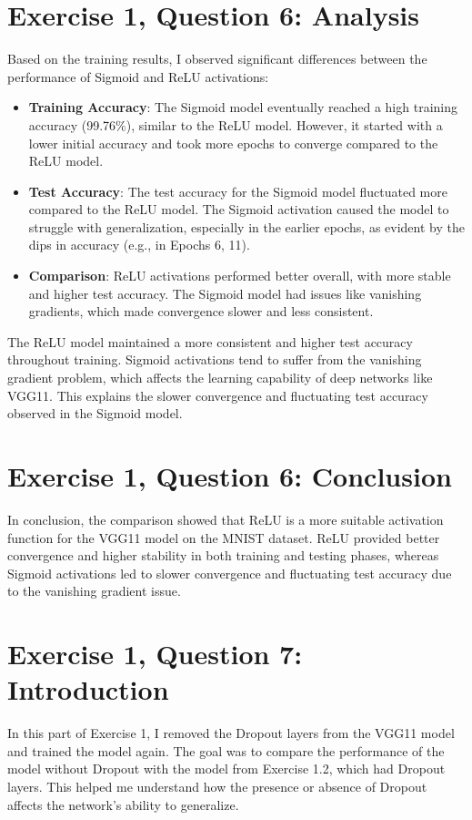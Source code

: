 \documentclass[10pt,letter,notitlepage]{article}
\begin{document}
\begin{center}
\section{Exercise 1, Question 6: Analysis}
Based on the training results, I observed significant differences between the performance of Sigmoid and ReLU activations:
\begin{itemize}
    \item \textbf{Training Accuracy}: The Sigmoid model eventually reached a high training accuracy (99.76\%), similar to the ReLU model. However, it started with a lower initial accuracy and took more epochs to converge compared to the ReLU model.
    \item \textbf{Test Accuracy}: The test accuracy for the Sigmoid model fluctuated more compared to the ReLU model. The Sigmoid activation caused the model to struggle with generalization, especially in the earlier epochs, as evident by the dips in accuracy (e.g., in Epochs 6, 11).
    \item \textbf{Comparison}: ReLU activations performed better overall, with more stable and higher test accuracy. The Sigmoid model had issues like vanishing gradients, which made convergence slower and less consistent.
\end{itemize}

The ReLU model maintained a more consistent and higher test accuracy throughout training. Sigmoid activations tend to suffer from the vanishing gradient problem, which affects the learning capability of deep networks like VGG11. This explains the slower convergence and fluctuating test accuracy observed in the Sigmoid model.

\section{Exercise 1, Question 6: Conclusion}
In conclusion, the comparison showed that ReLU is a more suitable activation function for the VGG11 model on the MNIST dataset. ReLU provided better convergence and higher stability in both training and testing phases, whereas Sigmoid activations led to slower convergence and fluctuating test accuracy due to the vanishing gradient issue.

\section{Exercise 1, Question 7: Introduction}
In this part of Exercise 1, I removed the Dropout layers from the VGG11 model and trained the model again. The goal was to compare the performance of the model without Dropout with the model from Exercise 1.2, which had Dropout layers. This helped me understand how the presence or absence of Dropout affects the network's ability to generalize.


\end{center}
\end{document}
